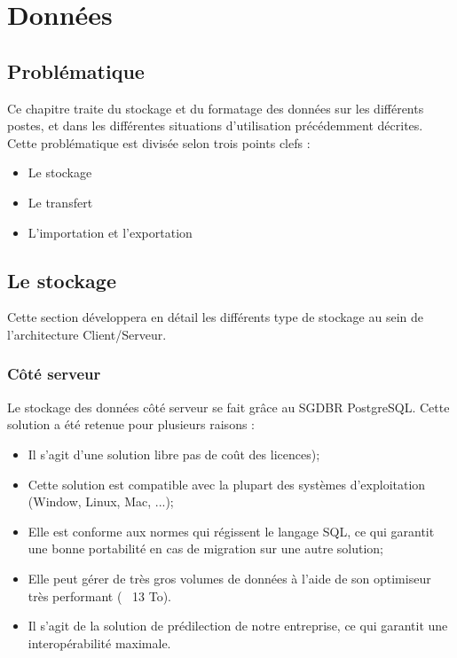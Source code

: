 \section{Données}

% 

\subsection{Problématique}

Ce chapitre traite du stockage et du formatage des données sur les différents postes, et dans les différentes situations d'utilisation précédemment décrites.
Cette problématique est divisée selon trois points clefs :
\begin{itemize}
	\item Le stockage
	\item Le transfert
	\item L'importation et l'exportation
\end{itemize}

\subsection{Le stockage}
Cette section développera en détail les différents type de stockage au sein de l'architecture Client/Serveur.

\subsubsection{Côté serveur}
Le stockage des données côté serveur se fait grâce au SGDBR PostgreSQL. Cette solution a été retenue pour plusieurs raisons :
\begin{itemize}
	\item Il s'agit d'une solution libre pas de coût des licences);
	\item Cette solution est compatible avec la plupart des systèmes d'exploitation (Window, Linux, Mac, ...);
	\item Elle est conforme aux normes qui régissent le langage SQL, ce qui garantit une bonne portabilité en cas de migration sur une autre solution;
	\item Elle peut gérer de très gros volumes de données à l'aide de son optimiseur très performant (~ 13 To).
	\item Il s'agit de la solution de prédilection de notre entreprise, ce qui garantit une interopérabilité maximale.
\end{itemize}


